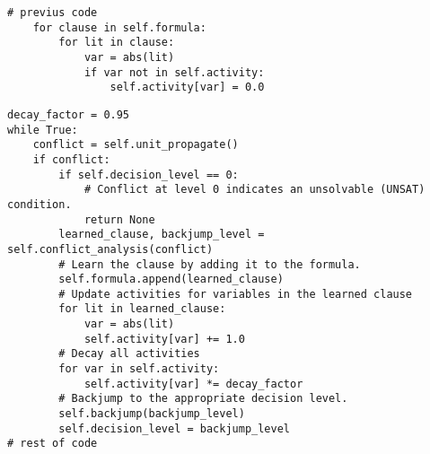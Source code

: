 \begin{lstlisting}
# previus code
    for clause in self.formula:
        for lit in clause:
            var = abs(lit)
            if var not in self.activity:
                self.activity[var] = 0.0
\end{lstlisting}

\begin{lstlisting}
decay_factor = 0.95
while True:
    conflict = self.unit_propagate()
    if conflict:
        if self.decision_level == 0:
            # Conflict at level 0 indicates an unsolvable (UNSAT) condition.
            return None
        learned_clause, backjump_level = self.conflict_analysis(conflict)
        # Learn the clause by adding it to the formula.
        self.formula.append(learned_clause)
        # Update activities for variables in the learned clause
        for lit in learned_clause:
            var = abs(lit)
            self.activity[var] += 1.0
        # Decay all activities
        for var in self.activity:
            self.activity[var] *= decay_factor
        # Backjump to the appropriate decision level.
        self.backjump(backjump_level)
        self.decision_level = backjump_level
# rest of code
\end{lstlisting}


